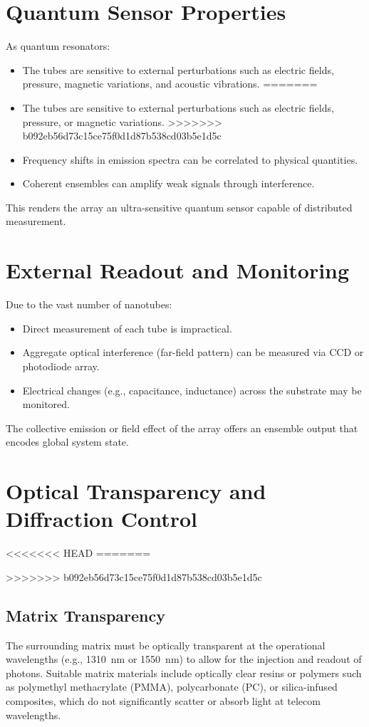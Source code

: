 \documentclass[11pt]{article}
\begin{document}
	\section{Quantum Sensor Properties}
	As quantum resonators:
	\begin{itemize}
<<<<<<< HEAD
		\item The tubes are sensitive to external perturbations such as electric fields, pressure, magnetic variations, and acoustic vibrations.
=======
		\item The tubes are sensitive to external perturbations such as electric fields, pressure, or magnetic variations.
>>>>>>> b092eb56d73c15ce75f0d1d87b538cd03b5e1d5c
		\item Frequency shifts in emission spectra can be correlated to physical quantities.
		\item Coherent ensembles can amplify weak signals through interference.
	\end{itemize}
	This renders the array an ultra-sensitive quantum sensor capable of distributed measurement.
	
	\section{External Readout and Monitoring}
	Due to the vast number of nanotubes:
	\begin{itemize}
		\item Direct measurement of each tube is impractical.
		\item Aggregate optical interference (far-field pattern) can be measured via CCD or photodiode array.
		\item Electrical changes (e.g., capacitance, inductance) across the substrate may be monitored.
	\end{itemize}
	The collective emission or field effect of the array offers an ensemble output that encodes global system state.
	
	\section{Optical Transparency and Diffraction Control}
<<<<<<< HEAD
=======
	
>>>>>>> b092eb56d73c15ce75f0d1d87b538cd03b5e1d5c
	\subsection{Matrix Transparency}
	The surrounding matrix must be optically transparent at the operational wavelengths (e.g., \SI{1310}{\nano\meter} or \SI{1550}{\nano\meter}) to allow for the injection and readout of photons. Suitable matrix materials include optically clear resins or polymers such as polymethyl methacrylate (PMMA), polycarbonate (PC), or silica-infused composites, which do not significantly scatter or absorb light at telecom wavelengths.
	
\end{document}

